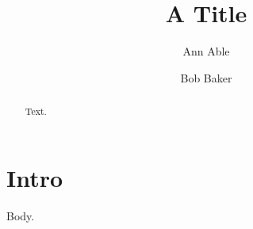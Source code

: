 \documentclass{aastex701}
\begin{document}
\title{A Title}
\author{Ann Able}
\author{Bob Baker}
\begin{abstract}
Text.
\end{abstract}
\section{Intro} Body.
\end{document}
